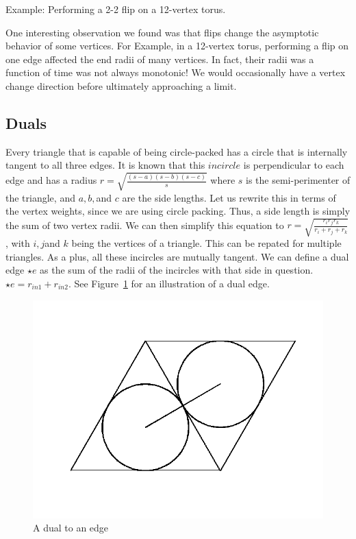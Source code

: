\documentclass[12pt]{article}
\begin{document}
\noindent Example: Performing a 2-2 flip on a 12-vertex torus. \newline

\noindent One interesting observation we found was that flips change the asymptotic behavior of some vertices. For Example, in a 12-vertex torus, performing a flip on one edge affected the end radii of many vertices. In fact, their radii was a function of time was not always monotonic! We would occasionally have a vertex change direction before ultimately approaching a limit. 

\subsection{Duals}
\maketitle

Every triangle that is capable of being circle-packed has a circle that is internally tangent to all three edges. It is known that this $incircle$ is perpendicular to each edge and has a radius $\displaystyle r = \sqrt{\frac{(s-a)(s-b)(s-c)}{s}}$ where $s$ is the semi-perimenter of the triangle, and $a, b, $and $c$ are the side lengths. Let us rewrite this in terms of the vertex weights, since we are using circle packing. Thus, a side length is simply the sum of two vertex radii. We can then simplify this equation to $\displaystyle r = \sqrt{\frac{r_i r_j r_k}{r_i + r_j + r_k}}$, with $i, j $and $k$ being the vertices of a triangle. This can be repated for multiple triangles. As a plus, all these incircles are mutually tangent. We can define a dual edge $\star e$ as the sum of the radii of the incircles with that side in question. $\star e = r_{in1} + r_{in2}$. See Figure~\ref{fig:dual} for an illustration of a dual edge.\newline

\begin{figure}
\centering
\includegraphics[scale = 0.4]{dual.png}
\caption{A dual to an edge}
\label{fig:dual}
\end{figure}
\end{document}
